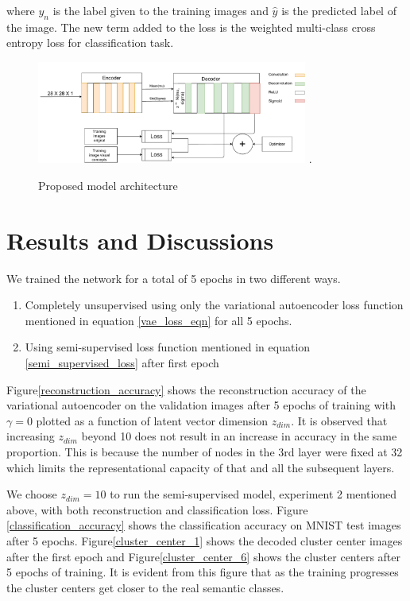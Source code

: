 \documentclass{uai2021} %
\begin{document}
where $y_n$ is the label given to the training images and $\hat{y}$ is the predicted label of the image.
The new term added to the loss is the weighted multi-class cross entropy loss for classification task.

\begin{figure}[!t]
\centering
\includegraphics[width=3.5in]{images/cnn_arch.pdf}
\DeclareGraphicsExtensions.
\caption{Proposed model architecture}
\label{vae_architecture}
\end{figure}

\section{Results and Discussions} \label{results}

We trained the network for a total of 5 epochs in two different ways.
\begin{enumerate}
    \item Completely unsupervised using only the variational autoencoder loss function mentioned in equation \ref{vae_loss_eqn} for all 5 epochs.
    \item Using semi-supervised loss function mentioned in equation \ref{semi_supervised_loss} after first epoch
\end{enumerate}


Figure\ref{reconstruction_accuracy} shows  the reconstruction accuracy of the variational autoencoder on the validation images after 5 epochs of training with $\gamma = 0$  plotted as a function of latent vector dimension $z_{dim}$.
It is observed that increasing $z_{dim}$ beyond 10 does not result in an increase in accuracy in the same proportion.
This is because the number of nodes in the 3rd layer were fixed at 32 which limits the representational capacity of that and all the subsequent layers.

We choose $z_{dim}=10$ to run the  semi-supervised model, experiment 2 mentioned above,  with both reconstruction and classification loss.
Figure \ref{classification_accuracy} shows the classification accuracy on MNIST test images after 5 epochs.
Figure\ref{cluster_center_1} shows the decoded cluster center images after the first epoch and Figure\ref{cluster_center_6} shows the cluster centers after 5 epochs of training.
It is evident from this figure that as the training progresses the cluster centers get closer to the real semantic classes.
\end{document}
